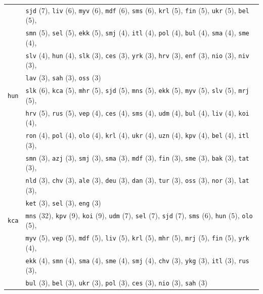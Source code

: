 \begin{center}
\begin{longtable}{ll}
 & \texttt{sjd} (7), \texttt{liv} (6), \texttt{myv} (6), \texttt{mdf} (6), \texttt{sms} (6), \texttt{krl} (5), \texttt{fin} (5), \texttt{ukr} (5), \texttt{bel} (5), \\
 & \texttt{smn} (5), \texttt{sel} (5), \texttt{ekk} (5), \texttt{smj} (4), \texttt{itl} (4), \texttt{pol} (4), \texttt{bul} (4), \texttt{sma} (4), \texttt{sme} (4), \\
 & \texttt{slv} (4), \texttt{hun} (4), \texttt{slk} (3), \texttt{ces} (3), \texttt{yrk} (3), \texttt{hrv} (3), \texttt{enf} (3), \texttt{nio} (3), \texttt{niv} (3), \\
 & \texttt{lav} (3), \texttt{sah} (3), \texttt{oss} (3) \\
\texttt{hun} & \texttt{slk} (6), \texttt{kca} (5), \texttt{mhr} (5), \texttt{sjd} (5), \texttt{mns} (5), \texttt{ekk} (5), \texttt{myv} (5), \texttt{slv} (5), \texttt{mrj} (5), \\
 & \texttt{hrv} (5), \texttt{rus} (5), \texttt{vep} (4), \texttt{ces} (4), \texttt{sms} (4), \texttt{udm} (4), \texttt{bul} (4), \texttt{liv} (4), \texttt{koi} (4), \\
 & \texttt{ron} (4), \texttt{pol} (4), \texttt{olo} (4), \texttt{krl} (4), \texttt{ukr} (4), \texttt{uzn} (4), \texttt{kpv} (4), \texttt{bel} (4), \texttt{itl} (3), \\
 & \texttt{smn} (3), \texttt{azj} (3), \texttt{smj} (3), \texttt{sma} (3), \texttt{mdf} (3), \texttt{fin} (3), \texttt{sme} (3), \texttt{bak} (3), \texttt{tat} (3), \\
 & \texttt{nld} (3), \texttt{chv} (3), \texttt{ale} (3), \texttt{deu} (3), \texttt{dan} (3), \texttt{tur} (3), \texttt{oss} (3), \texttt{nor} (3), \texttt{lat} (3), \\
 & \texttt{ket} (3), \texttt{sel} (3), \texttt{eng} (3) \\
\texttt{kca} & \texttt{mns} (32), \texttt{kpv} (9), \texttt{koi} (9), \texttt{udm} (7), \texttt{sel} (7), \texttt{sjd} (7), \texttt{sms} (6), \texttt{hun} (5), \texttt{olo} (5), \\
 & \texttt{myv} (5), \texttt{vep} (5), \texttt{mdf} (5), \texttt{liv} (5), \texttt{krl} (5), \texttt{mhr} (5), \texttt{mrj} (5), \texttt{fin} (5), \texttt{yrk} (4), \\
 & \texttt{ekk} (4), \texttt{smn} (4), \texttt{sma} (4), \texttt{sme} (4), \texttt{smj} (4), \texttt{chv} (3), \texttt{ykg} (3), \texttt{itl} (3), \texttt{rus} (3), \\
 & \texttt{bul} (3), \texttt{bel} (3), \texttt{ukr} (3), \texttt{pol} (3), \texttt{ces} (3), \texttt{nio} (3), \texttt{sah} (3) \\

\end{longtable}
\end{center}
